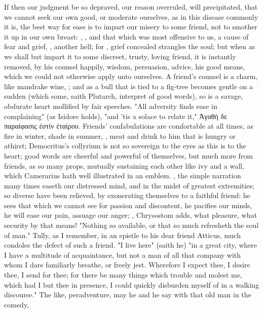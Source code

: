 {If then our judgment be so depraved, our reason overruled, will precipitated, that we cannot seek our own good, or moderate ourselves, as in this disease commonly it is, the best way for ease is to impart our misery to some friend, not to smother it up in our own breast: , \etc{}, and that which was most offensive to us, a cause of fear and grief, , another hell; for , grief concealed strangles the soul; but when as we shall but impart it to some discreet, trusty, loving friend, it is instantly removed, by his counsel happily, wisdom, persuasion, advice, his good means, which we could not otherwise apply unto ourselves. A friend's counsel is a charm, like mandrake wine, ; and as a bull that is tied to a fig-tree becomes gentle on a sudden (which some, saith Plutarch, interpret of good words), so is a savage, obdurate heart mollified by fair speeches. "All adversity finds ease in complaining" (as Isidore holds), "and 'tis a solace to relate it," \textgreek[variant=ancient]{Ἀγαθὴ δε παραίφασις ἐστὶν ἐταίρου}. Friends' confabulations are comfortable at all times, as fire in winter, shade in summer, , meat and drink to him that is hungry or athirst; Democritus's collyrium is not so sovereign to the eyes as this is to the heart; good words are cheerful and powerful of themselves, but much more from friends, as so many props, mutually sustaining each other like ivy and a wall, which Camerarius hath well illustrated in an emblem. , the simple narration many times easeth our distressed mind, and in the midst of greatest extremities; so diverse have been relieved, by exonerating themselves to a faithful friend: he sees that which we cannot see for passion and discontent, he pacifies our minds, he will ease our pain, assuage our anger; , Chrysostom adds, what pleasure, what security by that means! "Nothing so available, or that so much refresheth the soul of man." Tully, as I remember, in an epistle to his dear friend Atticus, much condoles the defect of such a friend. "I live here" (saith he) "in a great city, where I have a multitude of acquaintance, but not a man of all that company with whom I dare familiarly breathe, or freely jest. Wherefore I expect thee, I desire thee, I send for thee; for there be many things which trouble and molest me, which had I but thee in presence, I could quickly disburden myself of in a walking discourse." The like, peradventure, may he and he say with that old man in the comedy,

}
